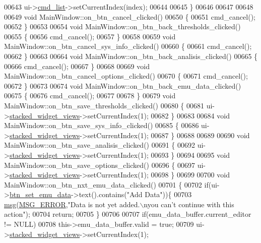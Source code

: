 \begin{DoxyCode}
00643     ui->\hyperlink{a00080_aa66ece71395b435e915d384fb63bac1d}{cmd\_list}->setCurrentIndex(index);
00644 
00645 \}
00646 
00647 
00648 
00649 \textcolor{keywordtype}{void} MainWindow::on\_btn\_cancel\_clicked()
00650 \{
00651     cmd\_cancel();
00652 \}
00653 
00654 \textcolor{keywordtype}{void} MainWindow::on\_btn\_back\_thresholds\_clicked()
00655 \{
00656     cmd\_cancel();
00657 \}
00658 
00659 \textcolor{keywordtype}{void} MainWindow::on\_btn\_cancel\_sys\_info\_clicked()
00660 \{
00661     cmd\_cancel();
00662 \}
00663 
00664 \textcolor{keywordtype}{void} MainWindow::on\_btn\_back\_analisis\_clicked()
00665 \{
00666     cmd\_cancel();
00667 \}
00668 
00669 \textcolor{keywordtype}{void} MainWindow::on\_btn\_cancel\_options\_clicked()
00670 \{
00671     cmd\_cancel();
00672 \}
00673 
00674 \textcolor{keywordtype}{void} MainWindow::on\_btn\_back\_emu\_data\_clicked()
00675 \{
00676     cmd\_cancel();
00677 
00678 \}
00679 \textcolor{keywordtype}{void} MainWindow::on\_btn\_save\_thresholds\_clicked()
00680 \{
00681      ui->\hyperlink{a00080_a59e39bd3d716004e840a5be5dda18b96}{stacked\_widget\_views}->setCurrentIndex(1);
00682 \}
00683 
00684 \textcolor{keywordtype}{void} MainWindow::on\_btn\_save\_sys\_info\_clicked()
00685 \{
00686     ui->\hyperlink{a00080_a59e39bd3d716004e840a5be5dda18b96}{stacked\_widget\_views}->setCurrentIndex(1);
00687 \}
00688 
00689 
00690 \textcolor{keywordtype}{void} MainWindow::on\_btn\_save\_analisis\_clicked()
00691 \{
00692     ui->\hyperlink{a00080_a59e39bd3d716004e840a5be5dda18b96}{stacked\_widget\_views}->setCurrentIndex(1);
00693 \}
00694 
00695 \textcolor{keywordtype}{void} MainWindow::on\_btn\_save\_options\_clicked()
00696 \{
00697     ui->\hyperlink{a00080_a59e39bd3d716004e840a5be5dda18b96}{stacked\_widget\_views}->setCurrentIndex(1);
00698 \}
00699 
00700 \textcolor{keywordtype}{void} MainWindow::on\_btn\_nxt\_emu\_data\_clicked()
00701 \{
00702     \textcolor{keywordflow}{if}(ui->\hyperlink{a00080_ad05944ce9c8afb0ab60549a326b8e0af}{btn\_set\_emu\_data}->text().contains(\textcolor{stringliteral}{"Add Data"}))\{
00703         \hyperlink{a00017_a6134b74dbfffbaf333e169bd09597b53}{msg}(\hyperlink{a00090_aa8a990825a5a62c89d2fb8b08d8a1070}{MSG\_ERROR},\textcolor{stringliteral}{"Data is not yet added.\(\backslash\)nyou can’t continue with this action"});
00704         \textcolor{keywordflow}{return};
00705     \}
00706 
00707     \textcolor{keywordflow}{if}(emu\_data\_buffer.current\_editor != NULL)
00708         this->emu\_data\_buffer.valid = \textcolor{keyword}{true};
00709      ui->\hyperlink{a00080_a59e39bd3d716004e840a5be5dda18b96}{stacked\_widget\_views}->setCurrentIndex(1);

\end{DoxyCode}
